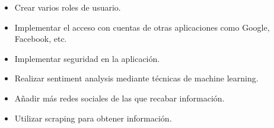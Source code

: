 \begin{itemize}
    \item Crear varios roles de usuario.
    \item Implementar el acceso con cuentas de otras aplicaciones como Google, Facebook, etc.
    \item Implementar seguridad en la aplicación.
    \item Realizar sentiment analysis mediante técnicas de machine learning.
    \item Añadir más redes sociales de las que recabar información.
    \item Utilizar scraping para obtener información.
\end{itemize}